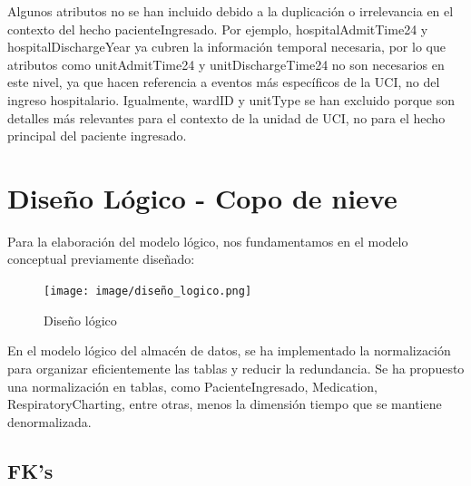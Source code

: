 \documentclass[12pt, a4paper, twoside]{article}
\begin{document}
	Algunos atributos no se han incluido debido a la duplicación o irrelevancia en el contexto del hecho pacienteIngresado. Por ejemplo, hospitalAdmitTime24 y hospitalDischargeYear ya cubren la información temporal necesaria, por lo que atributos como unitAdmitTime24 y unitDischargeTime24 no son necesarios en este nivel, ya que hacen referencia a eventos más específicos de la UCI, no del ingreso hospitalario. Igualmente, wardID y unitType se han excluido porque son detalles más relevantes para el contexto de la unidad de UCI, no para el hecho principal del paciente ingresado.  \cite{eICU2024}
	
	
	\section{Diseño Lógico - Copo de nieve}
	
	Para la elaboración del modelo lógico, nos fundamentamos en el modelo conceptual previamente diseñado:
	
	\begin{figure}[h!]
		\centering
		\texttt{[image: image/diseño\_logico.png]}
		\caption{Diseño lógico}
		\label{fig:11}
	\end{figure}
	
	En el modelo lógico del almacén de datos, se ha implementado la normalización para organizar eficientemente las tablas y reducir la redundancia. Se ha propuesto una normalización en tablas, como PacienteIngresado, Medication, RespiratoryCharting, entre otras, menos la dimensión tiempo que se mantiene denormalizada.
	
	\subsection{FK's}
	
\end{document}
